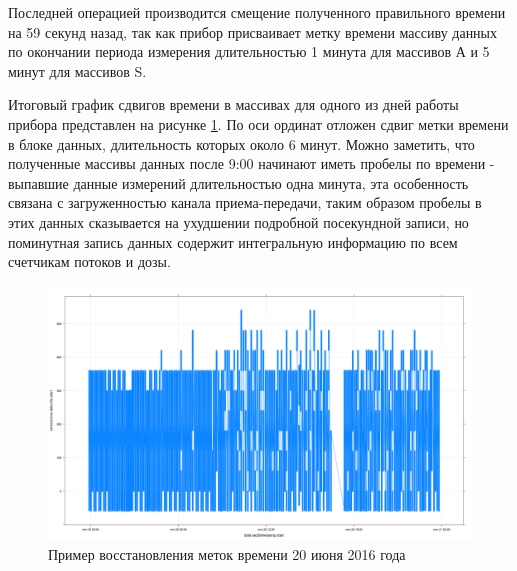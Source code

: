 Последней операцией производится смещение полученного правильного времени на 59 секунд назад, так как прибор присваивает метку времени массиву данных по окончании периода измерения длительностью 1 минута для массивов А и 5 минут для массивов S.

Итоговый график сдвигов времени в массивах для одного из дней работы прибора представлен на рисунке \ref{fig:deprontime172}. По оси ординат отложен сдвиг метки времени в блоке данных, длительность которых около 6 минут. Можно заметить, что полученные массивы данных после 9:00 начинают иметь пробелы по времени - выпавшие данные измерений длительностью одна минута, эта особенность связана с загруженностью канала приема-передачи, таким образом пробелы в этих данных сказывается на ухудшении подробной посекундной записи, но поминутная запись данных содержит интегральную информацию по всем счетчикам потоков и дозы.

\begin{figure}
	\centering
	\includegraphics[width=0.9\linewidth]{images/depron_time_172}
	\caption{Пример восстановления меток времени 20 июня 2016 года}
	\label{fig:deprontime172}
\end{figure}






